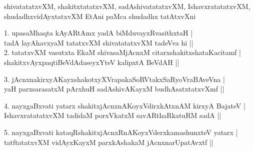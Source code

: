 \begin{entry}
\medskip

\begin{shl}
shivatatatxvXM, shakitxtatatxvXM, sadAshivatatatxvXM, IshavxratatatxvXM, shudadhxvidAyxtatxvXM EtAni paMca shudadhx tatAtxvXni
\end{shl}
\medskip
\begin{shl}
1. upasaMhaqta kAyARtAmx yadA biMduvayxRvasithxtaH |\\
tadA layAhavxyaM tatatxvXM shivatatatxvXM tadeVva hi ||\\
2. tatatxvXM vasutxta EkaM shivasaMjAcnxM citarxshakitxshataKacitamf |\\
shakitxvAyxpaqtiBeVdAdaseyxYteV kalipxtA BeVdAH ||\\
\end{shl}
\medskip
{}
\medskip
\begin{shl}
3. jAcnxnakirxyAKayxshakotxyXVrapakaSoRVtakxSaRyoVraBAveVna |\\
yaH parxsarasatxM pArxhuH sadAshivAKayxM budhAsatxtatxvXmf ||
\end{shl}
\medskip
\begin{shl}
4. nayxgaBxvati yatarx shakitxjAcnxnAKoyxVdirxkAtxnAM kirxyA BajateV |\\
IshavxratatatxvXM tadidaM porxVkatxM savARthaRkatuRM sadA ||
\end{shl}
\medskip
\begin{shl}
5. nayxgaBxvati kataqRshakitxjAcnxRnAKoyxVderxkamashunxteV yatarx |\\
tatftatatxvXM vidAyxKayxM parxkAshakaM jAcnxnarUpatAvxtf ||
\end{shl}
\medskip
{}
\end{entry}

